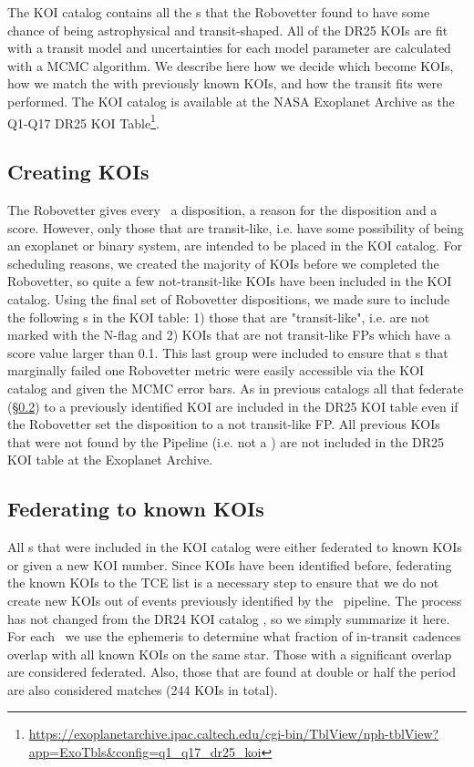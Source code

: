 The KOI catalog contains all the \opstce s that the Robovetter found to have some chance of being astrophysical and transit-shaped. All of the DR25 KOIs are fit with a transit model and uncertainties for each model parameter are calculated with a MCMC algorithm.  We describe here how we decide which  become KOIs, how we match the  with previously known KOIs, and how the transit fits were performed. The KOI catalog is available at the NASA Exoplanet Archive as the Q1-Q17 DR25 KOI Table\footnote{\url{https://exoplanetarchive.ipac.caltech.edu/cgi-bin/TblView/nph-tblView?app=ExoTbls\&config=q1\_q17\_dr25\_koi}}.
\label{koisec}

\subsection{Creating KOIs}
The Robovetter gives every \opstce\ a disposition, a reason for the disposition and a score.  However, only those that are transit-like, i.e. have some possibility of being an exoplanet or binary system, are intended to be placed in the KOI catalog. For scheduling reasons, we created the majority of KOIs before we completed the Robovetter, so quite a few not-transit-like KOIs have been included in the KOI catalog. Using the final set of Robovetter dispositions, we made sure to include the following \opstce s in the KOI table: 1) those that are "transit-like", i.e. are not marked with the N-flag and 2) KOIs that are not transit-like FPs which have a score value larger than 0.1.  This last group were included to ensure that \opstce s that marginally failed one Robovetter metric were easily accessible via the KOI catalog and given the MCMC error bars. As in previous catalogs all  that federate (\S\ref{s:federation}) to a previously identified KOI are included in the DR25 KOI table even if the Robovetter set the disposition to a not transit-like FP. All previous KOIs that were not found by the \Kepler{} Pipeline (i.e. not a \opstce{}) are not included in the DR25 KOI table at the Exoplanet Archive.


\subsection{Federating to known KOIs}
\label{s:federation}
All \opstce s that were included in the KOI catalog were either federated to known KOIs or given a new KOI number. Since KOIs have been identified before, federating the known KOIs to the TCE list is a necessary step to ensure that we do not create new KOIs out of events previously identified by the \Kepler\ pipeline.  The process has not changed from the DR24 KOI catalog \citep{Coughlin2016}, so we simply summarize it here.  For each \opstce\ we use the ephemeris to determine what fraction of in-transit cadences overlap with all known KOIs on the same star.  Those with a significant overlap are considered federated.  Also, those that are found at double or half the period are also considered matches (244 KOIs in total).  

